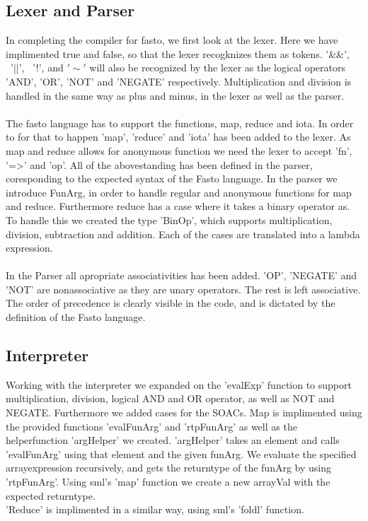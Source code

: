 \documentclass[12pt]{article}
\numberwithin{listing}{section}
\begin{document}
\subsection*{Lexer and Parser}
In completing the compiler for fasto, we first look at the lexer. 
Here we have implimented true and false, so that the lexer recogknizes them as tokens.
'\&\&', \ '||', \ '!', and $'\sim'$ will also be recognized by the lexer as the logical operators 
'AND', 'OR', 'NOT' and 'NEGATE' respectively. 
Multiplication and division is handled in the same way as plus and minus, in the lexer as well as the parser.
\\\\
The fasto language has to support the functions, map, reduce and iota. 
In order to for that to happen 'map', 'reduce' and 'iota' has been added to the lexer.
As map and reduce allows for anonymous function we need the lexer to accept 'fn', '=>' and 'op'.
All of the abovestanding has been defined in the parser, coresponding to the expected syntax of the Fasto language.
In the parser we introduce FunArg, in order to handle regular and anonymous functions for map and reduce. Furthermore reduce has a case 
where it takes a binary operator as. To handle this we created the type 'BinOp', which supports multiplication, division, subtraction and addition. Each of the cases are translated into a lambda expression. 
\\\\
In the Parser all apropriate associativities has been added. 'OP', 'NEGATE' and 'NOT' are nonassociative as they are unary operators.
The rest is left associative. The order of precedence is clearly visible in the code, and is dictated by the definition of the Fasto language.


\subsection*{Interpreter}
Working with the interpreter we expanded on the 'evalExp' function to support multiplication, division, logical AND and OR operator, as well as NOT and NEGATE. Furthermore we added cases for the SOACs. Map is implimented using the provided functions 'evalFunArg' and 'rtpFunArg' as well as the helperfunction 'argHelper' we created. 'argHelper' takes an element and calls 'evalFunArg' using that element and the given funArg. We evaluate the specified arrayexpression recursively, and gets the returntype of the funArg by using 'rtpFunArg'. Using sml's 'map' function we create a new arrayVal with the expected returntype. \\ 'Reduce' is implimented in a similar way, using sml's 'foldl' function.  
\end{document}
